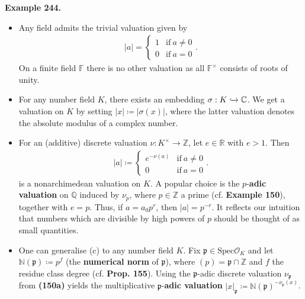 \documentclass[12pt,a4paper,footinclude=true,headinclude=true]{scrbook} %
\newenvironment{example}[2][Example]
    { \begin{mdframed}[backgroundcolor=gray!20] \textbf{#1 #2.} }
    {  \end{mdframed}}
\begin{document}
\begin{example}{244}
    \begin{itemize}
        \item[(a)] Any field admits the trivial valuation given by
        \begin{align*}
            |a|= \left\{\begin{array}{lc} 1 &\text{if}\ a\neq0 \\ 0 &\text{if}\ a=0 \end{array}\right..
        \end{align*}
        On a finite field $\mathbb{F}$ there is no other valuation as all $\mathbb{F}^\times$ consists of roots of unity.
        \item[(b)] For any number field $K$, there exists an embedding $\sigma:K\xhookrightarrow{} \mathbb{C}$. We get a valuation on $K$ by setting $|x|\coloneqq|\sigma(x)|$, where the latter valuation denotes the absolute modulus of a complex number.
        \item[(c)] For an (additive) discrete valuation $\nu:K^\times\to\mathbb{Z}$, let $e\in\mathbb{R}$ with $e>1$. Then
        \begin{align*}
            |a|\coloneqq \left\{\begin{array}{lc} e^{-\nu(a)} &\text{if}\ a\neq0 \\ 0 &\text{if}\ a=0 \end{array}\right..
        \end{align*}
        is a nonarchimedean valuation on $K$. A popular choice is the $p$-\textbf{adic valuation} on $\mathbb{Q}$ induced by $\nu_p$, where $p\in\mathbb{Z}$ a prime (cf. \textbf{Example 150}), together with $e=p$. Thus, if $a=a_0p^r$, then $|a|=p^{-r}$. It reflects our intuition that numbers which are divisible by high powers of $p$ should be thought of as small quantities.
        \item[(d)] One can generalise (c) to any number field $K$. Fix  $\mathfrak{p}\in\mathrm{Spec}\mathcal{O}_K$ and let $\mathbb{N}(\mathfrak{p})\coloneqq p^f$ (the \textbf{numerical norm} of $\mathfrak{p}$), where $(p)=\mathfrak{p}\cap\mathbb{Z}$ and $f$ the residue class degree (cf. \textbf{Prop. 155}). Using the $\mathfrak{p}$-adic discrete valuation $\nu_\mathfrak{p}$ from \textbf{(150a)} yields the multiplicative $\mathfrak{p}$-\textbf{adic valuation} $|x|_\mathfrak{p}\coloneqq\mathbb{N}(\mathfrak{p})^{-\nu_\mathfrak{p}(x)}$.
    \end{itemize}
\end{example}
\end{document}
